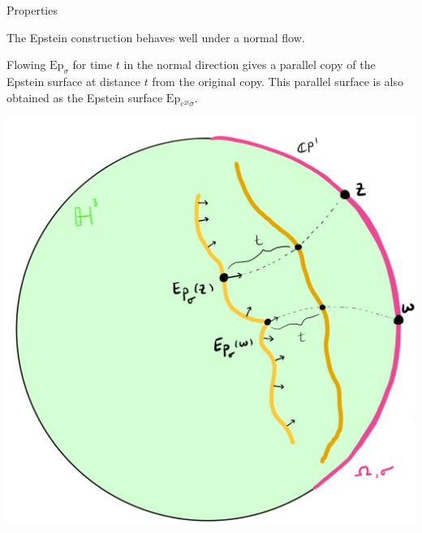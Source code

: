 \documentclass[professionalfont]{beamer}
\begin{document}
\begin{frame}{Properties}

The Epstein construction behaves well under a normal flow. 

Flowing $\mathrm{Ep}_\sigma$ for time $t$ in the normal direction gives a parallel copy of the Epstein surface at distance $t$ from the original copy. This parallel surface is also obtained as the Epstein surface $\mathrm{Ep}_{e^{2t}\sigma}$.

\centering\includegraphics[scale=0.09]{Parallel-10.jpg}

\end{frame}


\end{document}
